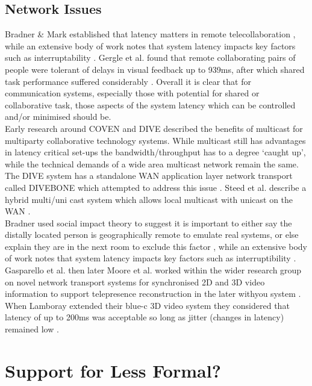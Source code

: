               \subsection{Network Issues}
            Bradner \& Mark established that latency matters in remote telecollaboration \cite{Bradner:2002:WDM:587078.587110}, while an extensive body of work notes that system latency impacts key factors such as interruptability \cite{Avrahami2007}. Gergle et al. found that remote collaborating pairs of people were tolerant of delays in visual feedback up to 939ms, after which shared task performance suffered considerably \cite{Gergle2006}. Overall it is clear that for communication systems, especially those with potential for shared or collaborative task, those aspects of the system latency which can be controlled and/or minimised should be.\\
             Early research around COVEN and DIVE described the benefits of multicast for multiparty collaborative technology systems. While multicast still has advantages in latency critical set-ups the bandwidth/throughput has to a degree `caught up', while the technical demands of a wide area multicast network remain the same. The DIVE system has a standalone WAN application layer network transport called DIVEBONE which attempted to address this issue \cite{Greenhalgh2001a}. Steed et al. describe a hybrid multi/uni cast system which allows local multicast with unicast on the WAN \cite{Greenhalgh2001}.\\
              Bradner used social impact theory to suggest  it is important to either say the distally located person is geographically remote to emulate real systems, or else explain they are in the next room to exclude this factor \cite{Bradner:2002:WDM:587078.587110}, while an extensive body of work notes that system latency impacts key factors such as interruptibility \cite{Avrahami2007}.\\
         Gasparello et al. \cite{Gasparello:2011in} then later Moore et al. \cite{Moore:2010jt} worked within the wider research group on novel network transport systems for synchronised 2D and 3D video information to support telepresence reconstruction in the later withyou system \cite{Roberts2015}. \\
       When Lamboray extended their blue-c 3D video system they considered that latency of up to 200ms was acceptable so long as jitter (changes in latency) remained low \cite{Park1999, lamboray2005data}.

        \section{Support for Less Formal?}
        
